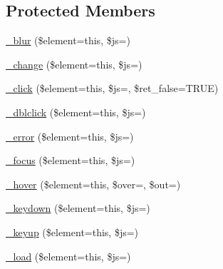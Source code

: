 \subsection*{Protected Members}
\begin{DoxyCompactItemize}
\item 
\mbox{\hyperlink{class_c_i___jquery_a1bb775476cdb3626681116886d245c2c}{\+\_\+blur}} (\$element=\textquotesingle{}this\textquotesingle{}, \$js=\textquotesingle{}\textquotesingle{})
\item 
\mbox{\hyperlink{class_c_i___jquery_abcb287d50d267968e11a1cb63637bfbb}{\+\_\+change}} (\$element=\textquotesingle{}this\textquotesingle{}, \$js=\textquotesingle{}\textquotesingle{})
\item 
\mbox{\hyperlink{class_c_i___jquery_a39604f0f7f540f32ea0c552e58322b5f}{\+\_\+click}} (\$element=\textquotesingle{}this\textquotesingle{}, \$js=\textquotesingle{}\textquotesingle{}, \$ret\+\_\+false=T\+R\+UE)
\item 
\mbox{\hyperlink{class_c_i___jquery_a0bf9741d68eb375f18c29b49dec6f984}{\+\_\+dblclick}} (\$element=\textquotesingle{}this\textquotesingle{}, \$js=\textquotesingle{}\textquotesingle{})
\item 
\mbox{\hyperlink{class_c_i___jquery_a8731ec925abaf39ed5e8635365c6512d}{\+\_\+error}} (\$element=\textquotesingle{}this\textquotesingle{}, \$js=\textquotesingle{}\textquotesingle{})
\item 
\mbox{\hyperlink{class_c_i___jquery_a793f87a37e811242a5fca42f4c242dd8}{\+\_\+focus}} (\$element=\textquotesingle{}this\textquotesingle{}, \$js=\textquotesingle{}\textquotesingle{})
\item 
\mbox{\hyperlink{class_c_i___jquery_a4d4b0aa0172ff0130de5ffb607a646fa}{\+\_\+hover}} (\$element=\textquotesingle{}this\textquotesingle{}, \$over=\textquotesingle{}\textquotesingle{}, \$out=\textquotesingle{}\textquotesingle{})
\item 
\mbox{\hyperlink{class_c_i___jquery_a30ac9d85c27478608dc702add9fae74a}{\+\_\+keydown}} (\$element=\textquotesingle{}this\textquotesingle{}, \$js=\textquotesingle{}\textquotesingle{})
\item 
\mbox{\hyperlink{class_c_i___jquery_a8671a9d5ea385d65bc6c7ff4b577adfe}{\+\_\+keyup}} (\$element=\textquotesingle{}this\textquotesingle{}, \$js=\textquotesingle{}\textquotesingle{})
\item 
\mbox{\hyperlink{class_c_i___jquery_a24c1ddb2247d180ca74532e991afd4f6}{\+\_\+load}} (\$element=\textquotesingle{}this\textquotesingle{}, \$js=\textquotesingle{}\textquotesingle{})

\end{DoxyCompactItemize}
